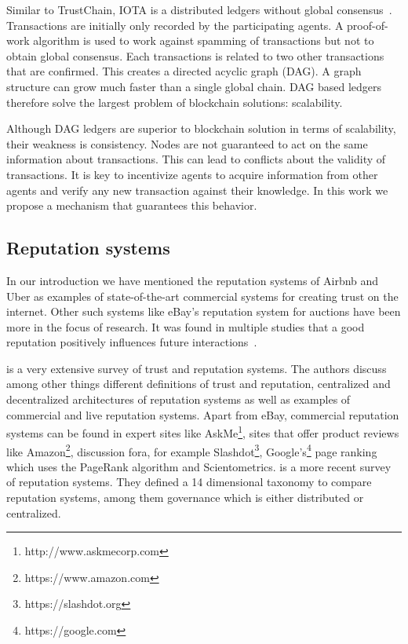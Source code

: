 Similar to TrustChain, IOTA is a distributed ledgers without global 
consensus~\cite{popov2016tangle}. Transactions are initially only recorded by the participating agents. A proof-of-work 
algorithm is used to work against spamming of transactions but not to obtain global consensus. Each
transactions is related to two other transactions that are confirmed. This creates a directed 
acyclic graph (DAG). A graph structure can grow much faster than a single global chain. DAG based 
ledgers therefore solve the largest problem of blockchain solutions: scalability.

Although DAG ledgers are superior to blockchain solution in terms of scalability, their weakness is
consistency. Nodes are not guaranteed to act on the same information about transactions. This can 
lead to conflicts about the validity of transactions. It is key to incentivize agents to acquire 
information from other agents and verify any new transaction against their knowledge. In this work
we propose a mechanism that guarantees this behavior.

\subsection{Reputation systems}
In our introduction we have mentioned the reputation systems of Airbnb and Uber as examples of 
state-of-the-art commercial systems for creating trust on the internet. Other such systems like 
eBay's reputation system for auctions have been more in the focus of research. It was found in 
multiple studies that a good reputation positively influences future interactions~\cite{resnick2002trust, houser2006reputation, dewan2004adverse}.

\cite{josang2007survey} is a very extensive survey of trust and reputation systems. The authors 
discuss among other things different definitions of trust and reputation, centralized and decentralized architectures 
of reputation systems as well as examples of commercial and live reputation systems. Apart from 
eBay, commercial reputation systems can be found in expert sites like AskMe\footnote{http://www.askmecorp.com},
sites that offer product reviews like Amazon\footnote{https://www.amazon.com}, discussion fora, 
for example Slashdot\footnote{https://slashdot.org}, Google's\footnote{https://google.com} page ranking which uses the PageRank
algorithm\cite{page1999pagerank} and Scientometrics. \cite{HENDRIKX2015184} is a more recent survey of reputation systems. They defined a 14 dimensional
taxonomy to compare reputation systems, among them governance which is either distributed or 
centralized. 


